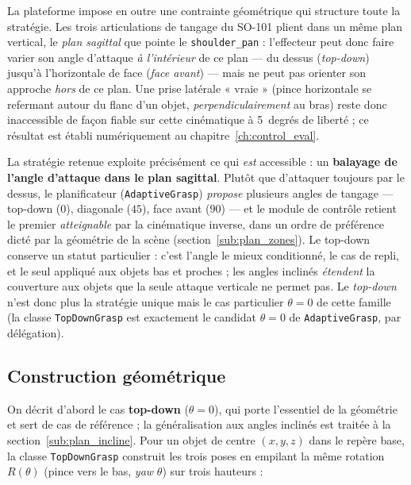 La plateforme impose en outre une contrainte géométrique qui structure toute la
stratégie. Les trois articulations de tangage du SO-101 plient dans un même plan
vertical, le \emph{plan sagittal} que pointe le \texttt{shoulder\_pan} : l'effecteur
peut donc faire varier son angle d'attaque \emph{à l'intérieur} de ce plan --- du
dessus (\textit{top-down}) jusqu'à l'horizontale de face (\textit{face avant}) ---
mais ne peut pas orienter son approche \emph{hors} de ce plan. Une prise latérale
« vraie » (pince horizontale se refermant autour du flanc d'un objet,
\emph{perpendiculairement} au bras) reste donc inaccessible de façon fiable sur
cette cinématique à 5~degrés de liberté ; ce résultat est établi numériquement au
chapitre~\ref{ch:control_eval}.

La stratégie retenue exploite précisément ce qui \emph{est} accessible : un
\textbf{balayage de l'angle d'attaque dans le plan sagittal}. Plutôt que d'attaquer
toujours par le dessus, le planificateur (\texttt{AdaptiveGrasp}) \emph{propose}
plusieurs angles de tangage --- top-down (\(0\)\textdegree), diagonale
(\(45\)\textdegree), face avant (\(90\)\textdegree) --- et le module de contrôle
retient le premier \emph{atteignable} par la cinématique inverse, dans un ordre de
préférence dicté par la géométrie de la scène (section~\ref{sub:plan_zones}). Le
top-down conserve un statut particulier : c'est l'angle le mieux conditionné, le
cas de repli, et le seul appliqué aux objets bas et proches ; les angles inclinés
\emph{étendent} la couverture aux objets que la seule attaque verticale ne permet
pas. Le \textit{top-down} n'est donc plus la stratégie unique mais le cas
particulier \(\theta = 0\) de cette famille (la classe \texttt{TopDownGrasp} est
exactement le candidat \(\theta = 0\) de \texttt{AdaptiveGrasp}, par délégation).

\subsection{Construction géométrique}

On décrit d'abord le cas \textbf{top-down} (\(\theta = 0\)), qui porte l'essentiel
de la géométrie et sert de cas de référence ; la généralisation aux angles
inclinés est traitée à la section~\ref{sub:plan_incline}. Pour un objet de centre
\((x, y, z)\) dans le repère base, la classe \texttt{TopDownGrasp} construit les
trois poses en empilant la même rotation \(R(\theta)\) (pince vers le bas,
\textit{yaw} \(\theta\)) sur trois hauteurs :

